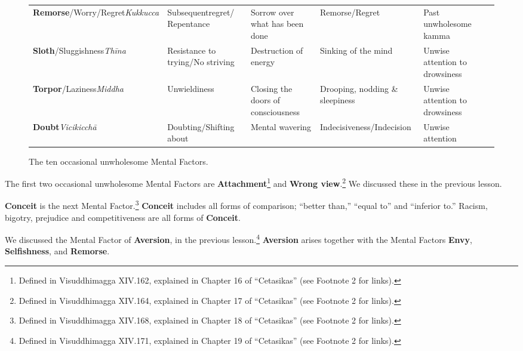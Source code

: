 \begin{figure} [H]
\begin{tabular}{P{0.25\textwidth} | C{.185\textwidth} C{0.185\textwidth} C{0.185\textwidth} C{0.195\textwidth} m{0mm}}
\textbf{Remorse}/\newline Worry/Regret\newline \textit{Kukkucca} & Subsequent\newline regret/ Repentance & Sorrow over what has been done & Remorse/\newline Regret & Past unwholesome kamma &\\[12mm]
\textbf{Sloth}/\newline Sluggishness\newline \textit{Thīna} & Resistance to trying/\newline No striving & Destruction of energy & Sinking of the mind & Unwise attention to drowsiness &\\[12mm]
\textbf{Torpor}/\newline Laziness\newline \textit{Middha} & Unwieldiness & Closing the doors of consciousness & Drooping, nodding \& sleepiness & Unwise attention to drowsiness &\\[12mm]
\textbf{Doubt}\newline \textit{Vicikicchā} & Doubting/\newline Shifting about & Mental wavering & Indecisiveness/\newline Indecision & Unwise attention &\\[12mm]
\bottomrule
\end{tabular}

\caption{The ten occasional unwholesome Mental Factors.}

\end{figure}

\pagebreak

The first two occasional unwholesome Mental Factors are \textbf{Attachment}\footnote{Defined in Visuddhimagga XIV.162, explained in Chapter 16 of “Cetasikas” (see Footnote 2 for links).} and \textbf{Wrong view}.\footnote{Defined in Visuddhimagga XIV.164, explained in Chapter 17 of “Cetasikas” (see Footnote 2 for links).} We discussed these in the previous lesson.

\textbf{Conceit} is the next Mental Factor.\footnote{Defined in Visuddhimagga XIV.168, explained in Chapter 18 of “Cetasikas” (see Footnote 2 for links).} \textbf{Conceit} includes all forms of comparison; “better than,” “equal to” and “inferior to.” Racism, bigotry, prejudice and competitiveness are all forms of \textbf{Conceit}.

We discussed the Mental Factor of \textbf{Aversion}, in the previous lesson.\footnote{Defined in Visuddhimagga XIV.171, explained in Chapter 19 of “Cetasikas” (see Footnote 2 for links).} \textbf{Aversion} arises together with the Mental Factors \textbf{Envy}, \textbf{Selfishness}, and \textbf{Remorse}.

